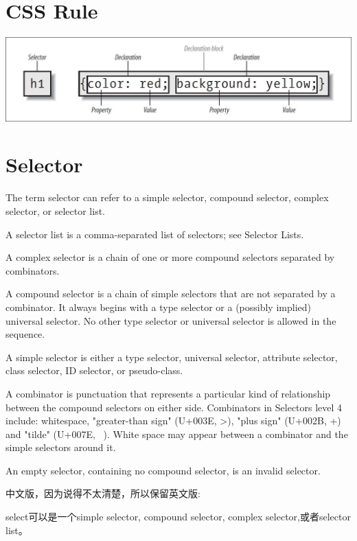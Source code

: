 \section{CSS Rule}

\includegraphics[scale=0.75]{css/resources/css-rule.jpg}

\section{Selector}

The term selector can refer to a simple selector, compound selector, complex selector, or selector list.

A selector list is a comma-separated list of selectors; see Selector Lists.

A complex selector is a chain of one or more compound selectors separated by combinators.

A compound selector is a chain of simple selectors that are not separated by a combinator. It always begins with a type selector or a (possibly implied) universal selector. No other type selector or universal selector is allowed in the sequence.

A simple selector is either a type selector, universal selector, attribute selector, class selector, ID selector, or pseudo-class.

A combinator is punctuation that represents a particular kind of relationship between the compound selectors on either side. Combinators in Selectors level 4 include: whitespace, "greater-than sign" (U+003E, >), "plus sign" (U+002B, +) and "tilde" (U+007E, ~). White space may appear between a combinator and the simple selectors around it.

An empty selector, containing no compound selector, is an invalid selector.


中文版，因为说得不太清楚，所以保留英文版:

select可以是一个simple selector, compound selector, complex selector,或者selector list。

